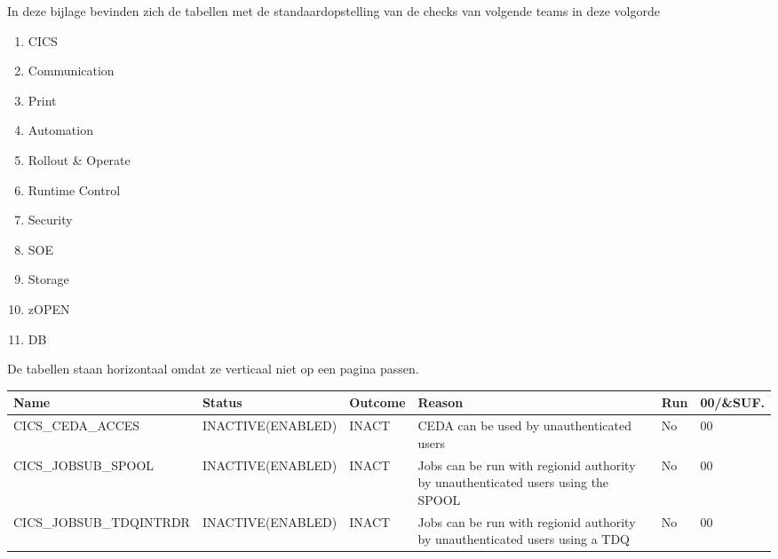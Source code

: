 
In deze bijlage bevinden zich de tabellen met de standaardopstelling van de checks van volgende teams in deze volgorde

\begin{enumerate}
	\item CICS
	\item Communication
	\item Print
	\item Automation
	\item Rollout \& Operate
	\item Runtime Control
	\item Security
	\item SOE
	\item Storage
	\item zOPEN
	\item DB
\end{enumerate}

De tabellen staan horizontaal omdat ze verticaal niet op een pagina passen.

\begin{landscape}
	\begin{table}[h]
		\begin{tabular}{|l|l|l|p{5cm}|l|l|}
			\hline
			\textbf{Name}                    & \textbf{Status}            & \textbf{Outcome} &\textbf{ Reason} & \textbf{Run} & \textbf{00/\&SUF.} \\ \hline
			CICS\_CEDA\_ACCES       & INACTIVE(ENABLED) & INACT   & CEDA   can be used by unauthenticated users                                        & No  & 00        \\ \hline
			CICS\_JOBSUB\_SPOOL     & INACTIVE(ENABLED) & INACT   & Jobs   can be run with regionid authority by unauthenticated users using the SPOOL & No  & 00        \\ \hline
			CICS\_JOBSUB\_TDQINTRDR & INACTIVE(ENABLED) & INACT   & Jobs   can be run with regionid authority by unauthenticated users using a TDQ     & No  & 00        \\ \hline
		\end{tabular}
	\end{table}
\end{landscape}

